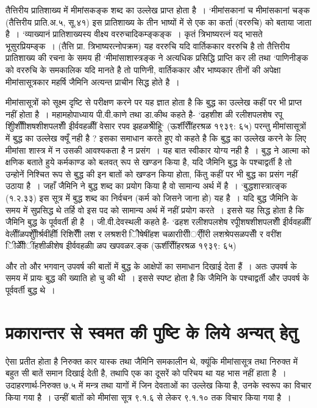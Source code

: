 {तैत्तिरीय प्रातिशाख्य में मीमांसकङ्क शब्द का उल्लेख प्राप्त होता है~। ‘मीमांसकानां च मीमांसकानां चङ्क (तैत्तिरीय प्राति.अ.५, सू.४१) इस प्रातिशाख्य के तीन भाष्यों में से एक का कर्ता (वररुचि) को बताया जाता है~। ‘व्याख्यानं प्रातिशाख्यस्य वीक्ष्य वररुचादिकम्ङ्कङ्क~। कृतं त्रिभाष्यरत्नं यद् भासते भूसुरप्रियम्ङ्क~। (तैत्ति प्रा. त्रिभाष्यरत्नोपक्रम) यह वररुचि यदि वार्तिककार वररुचि है तो तैत्तिरीय प्रातिशाख्य की रचना के समय ही ‘मीमांसाशास्त्रङ्क ने अत्यधिक प्रसिद्धि प्राप्ति कर ली तथा ‘पाणिनीङ्क को वररुचि के समकालिक यदि मानते है तो पाणिनी, वार्तिककार और भाष्यकार तीनों की अपेक्षा मीमांसासूत्रकार महर्षि जैमिनि अत्यन्त प्राचीन सिद्ध होते है~।

मीमांसासूत्रों को सूक्ष्म दृष्टि से परीक्षण करने पर यह ज्ञात होता है कि बुद्ध का उल्लेख कहीं पर भी प्राप्त नहीं होता है~। महामहोपाध्याय पी.वी.काणे तथा डा.कीथ कहते है- ‘ढहशीश ळी रलीशपलशेष रपू शुिीशीीीशषशीशपलशीें इीर्ववहळीीं वेसार रपव झहळश्रेीेहिू‘ (ऊर्शींरीींहरश्रळ १९३९: ६५) परन्तु मीमांसासूत्रों में बुद्ध का उल्लेख क्यूँ नही है ? इसका समाधान करते हुए वो कहते है कि बुद्ध का उल्लेख करने के लिए मीमांसा शास्त्र में न उसकी आवश्यकता है न प्रसंग~। यह बात स्वीकार योग्य नही है~। बुद्ध ने आत्मा को क्षणिक बताते हुये कर्मकाण्ड को बलवत् रूप से खण्डन किया है, यदि जैमिनि बुद्ध के पश्चाद्वर्ती है तो उन्होनें निश्चित रूप से बुद्ध की इन बातों को खण्डन किया होता, किंतु कहीं पर भी बुद्ध का प्रसंग नहीं उठाया है~। जहाँ जैमिनि ने बुद्ध शब्द का प्रयोग किया है वो सामान्य अर्थ में है~। ‘बुद्धशास्त्रात्ङ्क (१.२.३३) इस सूत्र में बुद्ध शब्द का निर्वचन (कर्म को जिसने जाना हो) यह है~। यदि बुद्ध जैमिनि के समय में सुप्रसिद्ध थे तर्हि वो इस पद को सामान्य अर्थ में नहीं प्रयोग करते~। इससे यह सिद्ध होता है कि जैमिनि बुद्ध के पूर्ववर्ती ही है~। जी.वी.देवस्थली कहते है- ‘ढहश रलीशपलशेष रपूीशषशीशपलशीें इीर्ववहळीीं वेलीींळपशीुेीर्श्रवींर्हीी रिशिरीीें लश र लश्रशरी िीेषेषींहश चळाराीरीीर्ीींरी लशश्रेपसळपसीें र वरींश िीळेीीेंींहशीळीशेष इीर्ववहळीा ळप खपवळर.ङ्क (ऊर्शींरीींहरश्रळ १९३९: ६५)

और तो और भगवान् उपवर्ष की बातों में बुद्ध के आक्षेपों का समाधान दिखाई देता हैं~। अतः उपवर्ष के समय में प्रायः बुद्ध की ख्याति हो चु की थी~। इससे स्पष्ट होता है कि जैमिनि के पश्चाद्वर्ती और उपवर्ष के पूर्ववर्ती बुद्ध थे~। 

\section*{प्रकारान्तर से स्वमत की पुष्टि के लिये अन्यत् हेतु} 

ऐसा प्रतीत होता है निरुक्त कार यास्क तथा जैमिनि समकालीन थे, क्यूंकि मीमांसासूत्र तथा निरुक्त   में बहुत सी बातें समान दिखाई देती है, तथापि एक का दूसरें को परिचय था यह भास नहीं हाता है~। उदाहरणार्थ-निरुक्त   ७.५ में मन्त्र तथा यागों में जिन देवताओं का उल्लेख किया है, उनके स्वरूप का विचार किया गया है~। उन्हीं बातों को मीमांसा सूत्र ९.१.६ से लेकर ९.१.१० तक विचार किया गया है~। 

}
